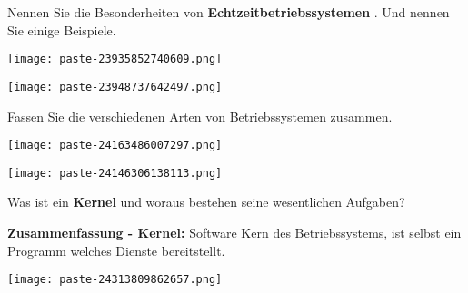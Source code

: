 \documentclass{article}
\begin{document}
\begin{tcolorbox}[colback=white!10!white,colframe=lightgray!75!black,
  savelowerto=\jobname_ex.tex,breakable,enhanced,lines before break=40]

\begin{center}
Nennen Sie die Besonderheiten von 
\textbf{Echtzeitbetriebssystemen
}. Und nennen Sie einige Beispiele.

\end{center}

\tcblower

\justifying
\begin{center}
\texttt{[image: paste-23935852740609.png]}
\end{center}
\begin{center}
\texttt{[image: paste-23948737642497.png]}
\end{center}

\end{tcolorbox}
\begin{tcolorbox}[colback=white!10!white,colframe=lightgray!75!black,
  savelowerto=\jobname_ex.tex,breakable,enhanced,lines before break=40]

\begin{center}
Fassen Sie die verschiedenen Arten von Betriebssystemen zusammen.

\end{center}

\tcblower

\justifying
\begin{center}
\texttt{[image: paste-24163486007297.png]}
\end{center}
\begin{center}
\texttt{[image: paste-24146306138113.png]}
\end{center}

\end{tcolorbox}
\begin{tcolorbox}[colback=white!10!white,colframe=lightgray!75!black,
  savelowerto=\jobname_ex.tex,breakable,enhanced,lines before break=40]

\begin{center}
Was ist ein 
\textbf{Kernel
}und woraus bestehen seine wesentlichen Aufgaben?

\end{center}

\tcblower

\justifying
\textbf{Zusammenfassung - Kernel:
}Software Kern des Betriebssystems, ist selbst ein Programm welches Dienste bereitstellt.
\begin{center}
\texttt{[image: paste-24313809862657.png]}
\end{center}

\end{tcolorbox}
\end{document}
